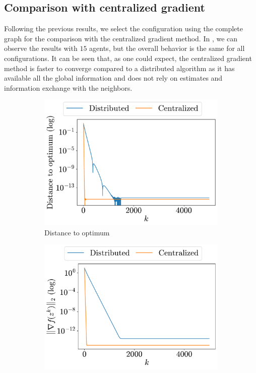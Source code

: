 \documentclass[a4paper,11pt,oneside]{book}
\begin{document}
\subsection{Comparison with centralized gradient}

Following the previous results, we select the configuration using the complete graph for the comparison with the centralized gradient method. In , we can observe the results with $15$ agents, but the overall behavior is the same for all configurations. It can be seen that, as one could expect, the centralized gradient method is faster to converge compared to a distributed algorithm as it has available all the global information and does not rely on estimates and information exchange with the neighbors.

\begin{figure}[H]
      \centering
      \begin{subfigure}[t]{0.46\linewidth}
            \centering
            \includegraphics[width=\linewidth]{./figs/quadratic/centralized/distance.pdf} 
            \caption{Distance to optimum}
      \end{subfigure}
      \hfill
      \begin{subfigure}[t]{0.46\linewidth}
            \centering
            \includegraphics[width=\linewidth]{./figs/quadratic/centralized/gradient.pdf} 

\end{subfigure}
\end{figure}
\end{document}
